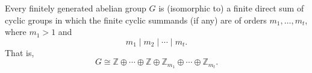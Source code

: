 Every finitely generated abelian group $G$ is (isomorphic to) a finite direct sum of cyclic groups in which the finite cyclic summands (if any) are of orders $m_1, \ldots, m_t$, where $m_1 > 1$ and
$$m_1 \mid m_2 \mid \cdots \mid m_t.$$
That is,
$$G \cong \mathbb{Z} \oplus \cdots \oplus \mathbb{Z} \oplus \mathbb{Z}_{m_1} \oplus \cdots \oplus \mathbb{Z}_{m_t}.$$
